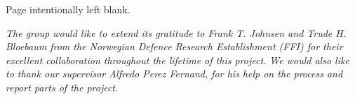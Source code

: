 \vspace*{\fill}
\begin{center}
Page intentionally left blank.
\end{center}
\vspace*{\fill}

\pagebreak

\vspace*{7cm}
\begin{center}

\emph{The group would like to extend its gratitude to Frank T. Johnsen and Trude H. Bloebaum from the Norwegian Defence Research Establishment (FFI) for their excellent collaboration throughout the lifetime of this project. We would also like to thank our supervisor Alfredo Perez Fernand, for his help on the process and report parts of the project.}

\end{center}